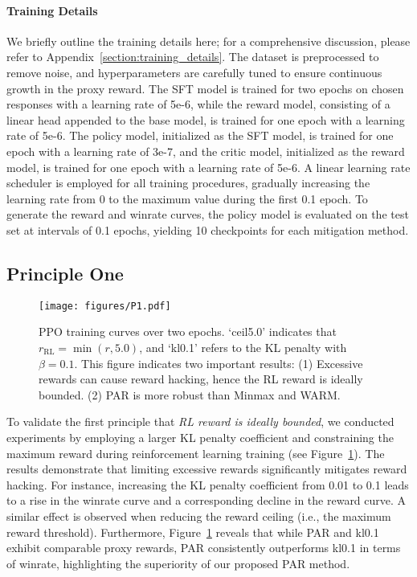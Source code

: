 \paragraph{Training Details}
We briefly outline the training details here; for a comprehensive discussion, please refer to Appendix~\ref{section:training_details}. The dataset is preprocessed to remove noise, and hyperparameters are carefully tuned to ensure continuous growth in the proxy reward. The SFT model is trained for two epochs on chosen responses with a learning rate of 5e-6, while the reward model, consisting of a linear head appended to the base model, is trained for one epoch with a learning rate of 5e-6. The policy model, initialized as the SFT model, is trained for one epoch with a learning rate of 3e-7, and the critic model, initialized as the reward model, is trained for one epoch with a learning rate of 5e-6. A linear learning rate scheduler is employed for all training procedures, gradually increasing the learning rate from 0 to the maximum value during the first 0.1 epoch. To generate the reward and winrate curves, the policy model is evaluated on the test set at intervals of 0.1 epochs, yielding 10 checkpoints for each mitigation method.

\subsection{Principle One}
\label{subsection:P1}
\begin{figure}[t]
\centering
\texttt{[image: figures/P1.pdf]}
\caption{PPO training curves over two epochs.  `ceil5.0' indicates that $r_{\text{RL}}=\min(r, 5.0)$, and `kl0.1' refers to the KL penalty with $\beta=0.1$. This figure indicates two important results: (1) Excessive rewards can cause reward hacking, hence the RL reward is ideally bounded. (2) PAR is more robust than Minmax and WARM.}
\label{fig:P1}
\end{figure}

To validate the first principle that \emph{RL reward is ideally bounded}, we conducted experiments by employing a larger KL penalty coefficient and constraining the maximum reward during reinforcement learning training (see Figure~\ref{fig:P1}). The results demonstrate that limiting excessive rewards significantly mitigates reward hacking. For instance, increasing the KL penalty coefficient from 0.01 to 0.1 leads to a rise in the winrate curve and a corresponding decline in the reward curve. A similar effect is observed when reducing the reward ceiling (i.e., the maximum reward threshold). Furthermore, Figure~\ref{fig:P1} reveals that while PAR and kl0.1 exhibit comparable proxy rewards, PAR consistently outperforms kl0.1 in terms of winrate, highlighting the superiority of our proposed PAR method.


